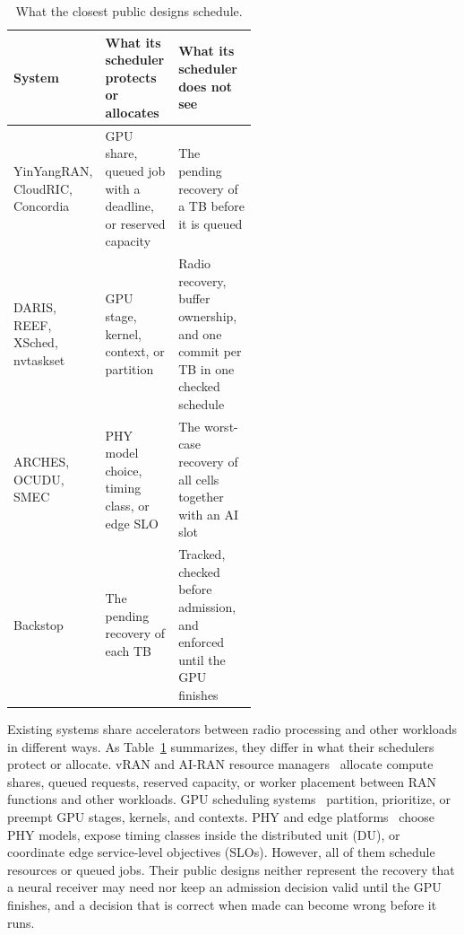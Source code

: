 \documentclass[acmsmall,screen,review,anonymous]{acmart}
\newcommand{\sys}{Backstop\xspace}
\begin{document}
\begin{table}[t]
\caption{What the closest public designs schedule.}
\label{tab:closest}
\footnotesize
\begin{tabularx}{\linewidth}{@{}>{\raggedright\arraybackslash}p{0.24\linewidth}>{\raggedright\arraybackslash}p{0.30\linewidth}>{\raggedright\arraybackslash}X@{}}
\toprule
System & What its scheduler protects or allocates & What its scheduler does not see \\
\midrule
YinYangRAN, CloudRIC, Concordia & GPU share, queued job with a deadline, or reserved capacity & The pending recovery of a TB before it is queued \\
DARIS, REEF, XSched, nvtaskset & GPU stage, kernel, context, or partition & Radio recovery, buffer ownership, and one commit per TB in one checked schedule \\
ARCHES, OCUDU, SMEC & PHY model choice, timing class, or edge SLO & The worst-case recovery of all cells together with an AI slot \\
\sys & The pending recovery of each TB & Tracked, checked before admission, and enforced until the GPU finishes \\
\bottomrule
\end{tabularx}
\end{table}

Existing systems share accelerators between radio processing and other workloads in different ways. As
Table~\ref{tab:closest} summarizes, they differ in what their schedulers protect or allocate. vRAN and
AI-RAN resource managers~\cite{yinyangran,cloudric,concordia,interplay,caora,haf,distributedairan}
allocate compute shares, queued requests, reserved capacity, or worker placement between RAN functions
and other workloads. GPU scheduling systems~\cite{daris,reef,xsched,nvtaskset} partition, prioritize, or
preempt GPU stages, kernels, and contexts. PHY and edge platforms~\cite{arches,ocudu,smec} choose PHY
models, expose timing classes inside the distributed unit (DU), or coordinate edge service-level
objectives (SLOs). However, all of them schedule resources or queued jobs. Their public designs neither
represent the recovery that a neural receiver may need nor keep an admission decision valid until the
GPU finishes, and a decision that is correct when made can become wrong before it runs.
\end{document}

